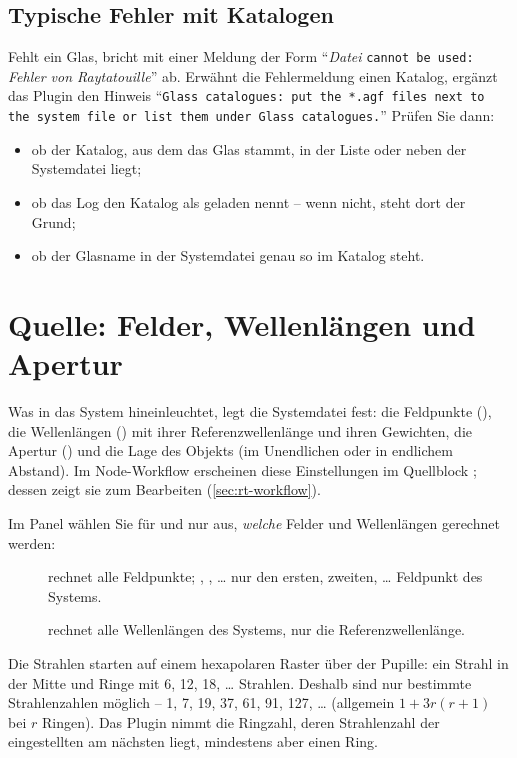 \subsection{Typische Fehler mit Katalogen}

Fehlt ein Glas, bricht  mit einer Meldung der Form \enquote{\textit{Datei}
\texttt{cannot be used:} \textit{Fehler von Raytatouille}} ab. Erwähnt die Fehlermeldung einen
Katalog, ergänzt das Plugin den Hinweis \enquote{\texttt{Glass catalogues: put the *.agf files
next to the system file or list them under Glass catalogues.}} Prüfen Sie dann:
\begin{itemize}
  \item ob der Katalog, aus dem das Glas stammt, in der Liste oder neben der Systemdatei liegt;
  \item ob das Log den Katalog als geladen nennt -- wenn nicht, steht dort der Grund;
  \item ob der Glasname in der Systemdatei genau so im Katalog steht.
\end{itemize}

\section{Quelle: Felder, Wellenlängen und Apertur}\label{sec:rt-quelle}

Was in das System hineinleuchtet, legt die Systemdatei fest: die Feldpunkte (),
die Wellenlängen () mit ihrer Referenzwellenlänge und ihren Gewichten, die
Apertur () und die Lage des Objekts (im Unendlichen oder in endlichem Abstand).
Im Node-Workflow erscheinen diese Einstellungen im Quellblock ; dessen
 zeigt sie zum Bearbeiten (\autoref{sec:rt-workflow}).

Im Panel wählen Sie für  und  nur aus, \emph{welche} Felder und
Wellenlängen gerechnet werden:

\begin{description}
  \item[]  rechnet alle Feldpunkte; , , \dots{} nur den
    ersten, zweiten, \dots{} Feldpunkt des Systems.
  \item[]  rechnet alle Wellenlängen des Systems, 
    nur die Referenzwellenlänge.
\end{description}

Die Strahlen starten auf einem hexapolaren Raster über der Pupille: ein Strahl in der Mitte und
Ringe mit 6, 12, 18, \dots{} Strahlen. Deshalb sind nur bestimmte Strahlenzahlen möglich --
1, 7, 19, 37, 61, 91, 127, \dots{} (allgemein $1 + 3r(r+1)$ bei $r$ Ringen). Das Plugin nimmt
die Ringzahl, deren Strahlenzahl der eingestellten am nächsten liegt, mindestens aber einen
Ring.


